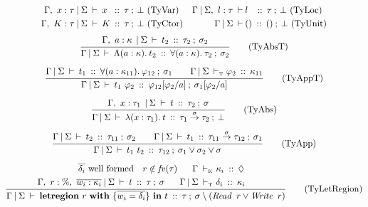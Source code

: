 \begin{figure}[ht!]


\begin{center}
 \\
\end{center}
\vspace{-1em}
\begin{gather*}
	\begin{aligned}
			\tyJudge {\Gamma, \ x : \tau} {\Sigma&} {x \ } {\tau} {\bot}
			\trm{\ (TyVar)}
	\\
			\tyJudge {\Gamma, \ K : \tau} {\Sigma&} {K} {\tau} {\bot}
			\trm{\ (TyCtor)}
	\end{aligned}
\quad
	\begin{aligned}
			\tyJudge{\Gamma} {\Sigma, \ l : \tau } 
					 {&l \ \:}{\tau}{\bot}
			\trm{\ (TyLoc)}
	\\
			\tyJudgeGS{&()}{()}{\bot}
			\trm{\ (TyUnit)}
	\end{aligned}
\\[0.5ex]
	\ruleI	{TyAbsT}
		{ \tyJudge	{\Gamma, \ a : \kappa \: } {\Sigma} {t_2} {\tau_2} {\sigma_2} }
		{ \tyJudgeGS	{\teLAM{a}{\kappa}{t_2}} {\tyForall{a}{\kappa}{\tau_2}} {\sigma_2} }
\\[1ex]
	\ruleI	{TyAppT}
		{  \tyJudgeGS {t_1} {\tyForall{a}{\kappa_{11}}{\varphi_{12}}} {\sigma_1} 
		   \qq
		   \kiJudgeGS {\varphi_2} {\kappa_{11}} 
		}
		{ \tyJudgeGS	{t_1 \ \varphi_2} {\varphi_{12}[\varphi_2/a]} {\sigma_1[\varphi_2/a]} 
		}
\\[1ex]
	\ruleI	{TyAbs}
		{ \tyJudge	{\Gamma, \ x : \tau_1 \: } {\Sigma} {t} {\tau_2} {\sigma} }
		{ \tyJudgeGS	{\teLam{x}{\tau_1}{t}} {\tau_1 \toa{\sigma} {\tau_2}} {\bot} }
\\[1ex]
	\ruleI	{TyApp}	
		{ \tyJudgeGS	{t_2} {\tau_{11}} {\sigma_2} 
		  \qq
		  \tyJudgeGS	{t_1} {\tau_{11} \toa{\sigma} \tau_{12}} {\sigma_1} 
		}
		{ \tyJudgeGS	{t_1 \ t_2} {\tau_{12}} {\sigma_1 \lor \sigma_2 \lor \sigma} }
\\[1ex]
	\ruleI	{TyLetRegion}
		{ \ov{\delta_i} \ \trm{well formed}  
		  \quad r \notin \ifv(\tau)
		  \quad \ \
		  \ksJudge	{\Gamma}{& \ \kappa_i}{\Diamond}
		  \\
		  \tyJudge	{\Gamma, \ r : \%, \ \ov{w_i : \kappa_i}} {\Sigma} {t} {\tau} {\sigma} 
		  \quad \ \
		  \kiJudgeGS	{& \ \delta_i}{\kappa_i}
		  \quad
		}
		{ \tyJudgeGS	{\teLetR{r}{\ov{w_i = \delta_i}}{t}} 
				{\tau} 
				{\sigma \setminus (\iRead \ r \lor \iWrite \ r)}
}
\end{gather*}
\end{figure}
